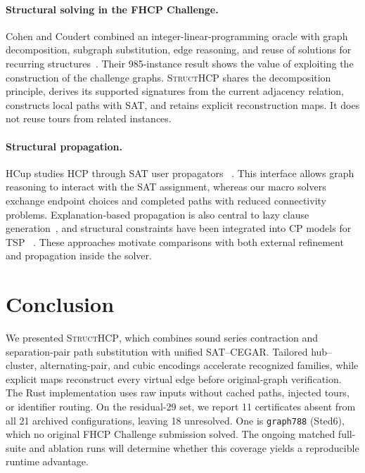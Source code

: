 \documentclass[sigconf,anonymous]{aamas}
\newcommand{\method}{\textsc{StructHCP}\xspace}
\begin{document}
\paragraph{Structural solving in the FHCP Challenge.}
Cohen and Coudert combined an integer-linear-programming oracle with
graph decomposition, subgraph substitution, edge reasoning, and reuse of
solutions for recurring structures~\cite{coudert2017defi}. Their
985-instance result shows the value of exploiting the construction of
the challenge graphs. \method shares the decomposition principle,
derives its supported signatures from the current adjacency relation,
constructs local paths with SAT, and retains explicit reconstruction
maps. It does not reuse tours from related instances.

\paragraph{Structural propagation.}
HCup studies HCP through SAT user propagators
~\cite{fazekas2024userpropagators,funder2026hcup}. This interface allows
graph reasoning to interact with the SAT assignment, whereas our macro
solvers exchange endpoint choices and completed paths with reduced
connectivity problems. Explanation-based propagation is also central to
lazy clause generation~\cite{ohrimenko2007lcg}, and structural
constraints have been integrated into CP models for TSP
~\cite{isoart2019structural}. These approaches motivate comparisons with
both external refinement and propagation inside the solver.

\section{Conclusion}
\label{sec:conclusion}

We presented \method, which combines sound series contraction and
separation-pair path substitution with unified SAT--CEGAR. Tailored
hub--cluster, alternating-pair, and cubic encodings accelerate recognized
families, while explicit maps reconstruct every virtual edge before
original-graph verification. The Rust implementation uses raw inputs
without cached paths, injected tours, or identifier routing. On the
residual-29 set, we report 11 certificates absent from all 21 archived
configurations, leaving 18 unresolved. One is \texttt{graph788} (Sted6),
which no original FHCP Challenge submission solved. The ongoing matched
full-suite and ablation runs will determine whether this coverage yields
a reproducible runtime advantage.

\balance


\end{document}
